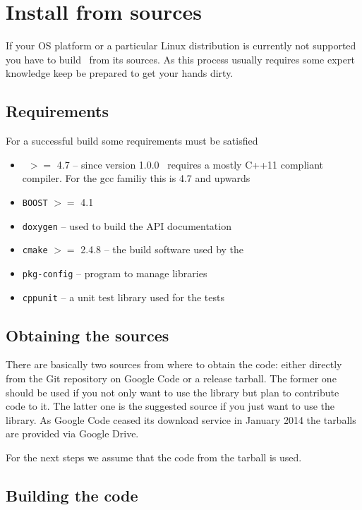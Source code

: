 \section{Install from sources}

If your OS platform or a particular Linux distribution is currently not
supported you have to build \libpnicore\ from its sources. As this process
usually requires some expert knowledge keep be prepared to get your hands dirty.

\subsection{Requirements}

For a successful build some requirements must be satisfied 
\begin{itemize} 
\item \gcc\ $>=$ 4.7 -- since version 1.0.0 \libpnicore\ requires a mostly C++11
compliant compiler. For the gcc familiy this is 4.7 and upwards 
\item {\tt BOOST} $>=$ 4.1 
\item {\tt doxygen} -- used to build the API documentation
\item {\tt cmake} $>=$ 2.4.8 -- the build software used by the \libpnicore
\item {\tt pkg-config} -- program to manage libraries
\item {\tt cppunit} -- a unit test library used for the tests
\end{itemize}

\subsection{Obtaining the sources}

There are basically two sources from where to obtain the code: either directly
from the Git repository on Google Code or a release tarball. The former one
should be used if you not only want to use the library but plan to contribute
code to it. The latter one is the suggested source if you just want to use the
library. 
As Google Code ceased its download service in January 2014 the tarballs are
provided via Google Drive. 

For the next steps we assume that the code from the tarball is used. 

\subsection{Building the code}

